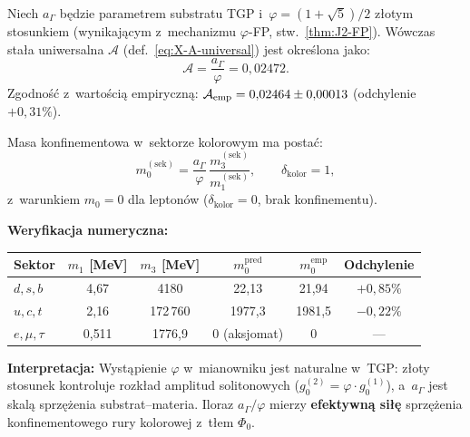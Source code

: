\begin{theorem}[Uniwersalna sta\l{}a konfinementowa
  $\mathcal{A} = a_\Gamma / \varphi$]%
\label{thm:X-A-golden}
Niech $a_\Gamma$ b\k{e}dzie parametrem substratu TGP
i~$\varphi = (1+\sqrt{5})/2$ z\l{}otym stosunkiem
(wynikaj\k{a}cym z~mechanizmu $\varphi$-FP,
stw.~\ref{thm:J2-FP}). W\'owczas sta\l{}a uniwersalna
$\mathcal{A}$ (def.~\eqref{eq:X-A-universal})
jest okre\'slona jako:
\begin{equation}\label{eq:X-A-golden}
  \boxed{\mathcal{A} = \frac{a_\Gamma}{\varphi} = 0{,}02472.}
\end{equation}
Zgodno\'s\'c z~warto\'sci\k{a} empiryczn\k{a}:
$\mathcal{A}_{\rm emp} = 0{,}02464 \pm 0{,}00013$
(odchylenie $+0{,}31\%$).

\medskip\noindent
Masa konfinementowa w~sektorze kolorowym ma posta\'c:
\begin{equation}\label{eq:X-m0-from-A}
  m_0^{(\mathrm{sek})} = \frac{a_\Gamma}{\varphi}\,
  \frac{m_3^{(\mathrm{sek})}}{m_1^{(\mathrm{sek})}},
  \qquad \delta_{\mathrm{kolor}} = 1,
\end{equation}
z~warunkiem $m_0 = 0$ dla lepton\'ow ($\delta_{\mathrm{kolor}} = 0$,
brak konfinementu).

\medskip\noindent\textbf{Weryfikacja numeryczna:}
\begin{center}\small
\begin{tabular}{@{}lccccc@{}}
\toprule
Sektor & $m_1$ [MeV] & $m_3$ [MeV] & $m_0^{\mathrm{pred}}$ & $m_0^{\mathrm{emp}}$
  & Odchylenie \\
\midrule
$d,s,b$ & 4{,}67 & 4180 & 22{,}13 & 21{,}94 & $+0{,}85\%$ \\
$u,c,t$ & 2{,}16 & 172\,760 & 1977{,}3 & 1981{,}5 & $-0{,}22\%$ \\
$e,\mu,\tau$ & 0{,}511 & 1776{,}9 & 0 (aksjomat) & 0 & --- \\
\bottomrule
\end{tabular}
\end{center}

\medskip\noindent\textbf{Interpretacja:}
Wyst\k{a}pienie $\varphi$ w~mianowniku jest naturalne w~TGP:
z\l{}oty stosunek kontroluje rozk\l{}ad amplitud solitonowych
($g_0^{(2)} = \varphi \cdot g_0^{(1)}$), a~$a_\Gamma$ jest
skal\k{a} sprz\k{e}\.zenia substrat--materia.
Iloraz $a_\Gamma/\varphi$ mierzy \textbf{efektywn\k{a}
si\l{}\k{e}} sprz\k{e}\.zenia konfinementowego rury kolorowej
z~t\l{}em $\Phi_0$.


\end{theorem}
